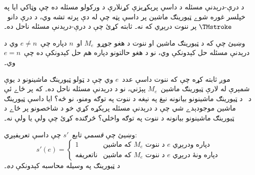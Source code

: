 \documentclass[../../../include/open-logic-section]{subfiles}
\begin{document}
\begin{prob}
د درې-درېدنې مسئله د داسې پرېکړيزې کړنلارې د ورکولو مسئله ده چې
وټاکي ايا په خپلسر غوره شوے ټيورينګ ماشين پر داسې پټه چې له دې پرته
تشه وي، د
درې دانو~$\TMstroke$ پر ننوت درېږي که نه۔ ثابته کړئ چې د درې-درېدنې
مسئله ناحل ده۔
\end{prob}

\begin{prob}
وښيئ چې که د ټيورينګ ماشين او ننوت د هغو جوړو~$M_e$ او~$n$ دپاره
چې~$e \neq n$ وي د درېدنې مسئله حل کېدونکې وي، نو د هغو حالتونو
دپاره هم حل کېدونکې ده چې~$e = n$ وي۔
\end{prob}

\begin{prob}
موږ ثابته کړه چې که ننوت داسې عدد~$e$ وي چې د ټولو ټيورينګ ماشينونو
د يوې شمېرې له لارې ټيورينګ ماشين~$M_e$ پېژني، نو د درېدنې مسئله
ناحل ده۔ که پر ځاے ئې د~ د ټيورينګ
ماشينونو بيانونه نېغ په نېغه د ننوت په توګه ومنو، نو څه؟ ايا داسې
ټيورينګ ماشين موجودېدے شي چې د درېدنې مسئله پرېکړه کړي خو د شاخصونو
پر ځاے د ټيورينګ ماشينونو بيانونه د ننوت په توګه واخلي؟ څرګنده کړئ
چې ولې يا ولې نه۔
\end{prob}

\begin{prob} وښيئ چې \emph{قسمي} تابع~$s'$ چې داسې تعريفېږي:
  \[
  s'(e) =
  \begin{cases}
    \text{1} & \text{که ماشين~$M_e$ د ننوت $e$ دپاره ودرېږي}\\
    \text{ناتعريفه} & \text{که ماشين~$M_e$ د ننوت $e$ دپاره ونۀ درېږي}
  \end{cases}
  \]
  د ټيورينګ په وسيله محاسبه کېدونکې \emph{ده}۔
\end{prob}
\end{document}
